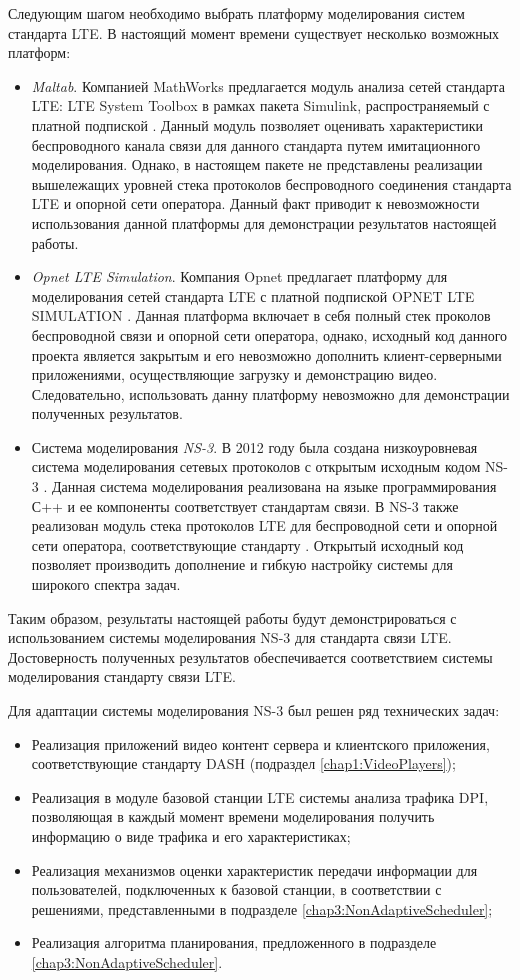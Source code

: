 Следующим шагом необходимо выбрать платформу моделирования систем стандарта LTE. В настоящий момент времени существует несколько возможных платформ:
\begin{itemize}
	\item \textit{Maltab}. Компанией MathWorks предлагается модуль анализа сетей стандарта LTE: LTE System Toolbox в рамках пакета Simulink, распространяемый с платной подпиской \cite{Matlab}. Данный модуль позволяет оценивать характеристики беспроводного канала связи для данного стандарта путем имитационного моделирования. Однако, в настоящем пакете не представлены реализации вышележащих уровней стека протоколов беспроводного соединения стандарта LTE и опорной сети оператора. Данный факт приводит к невозможности использования данной платформы для демонстрации результатов настоящей работы.
	\item \textit{Opnet LTE Simulation}. Компания Opnet предлагает платформу для моделирования сетей стандарта LTE с платной подпиской OPNET LTE SIMULATION \cite{Opnet}. Данная платформа включает в себя полный стек проколов беспроводной связи и опорной сети оператора, однако, исходный код данного проекта является закрытым и его невозможно дополнить клиент-серверными приложениями, осуществляющие загрузку и демонстрацию видео. Следовательно, использовать данну платформу невозможно для демонстрации полученных результатов.
	\item Система моделирования \textit{NS-3}. В 2012 году была создана низкоуровневая система моделирования сетевых протоколов с открытым исходным кодом NS-3 \cite{ns-3}. Данная система моделирования реализована на языке программирования С++ и ее компоненты соответствует стандартам связи. В NS-3 также реализован модуль стека протоколов LTE для беспроводной сети и опорной сети оператора, соответствующие стандарту \cite{lte_std}. Открытый исходный код позволяет производить дополнение и гибкую настройку системы для широкого спектра задач.
\end{itemize}

Таким образом, результаты настоящей работы будут демонстрироваться с использованием системы моделирования NS-3 для стандарта связи LTE. Достоверность полученных результатов обеспечивается соответствием системы моделирования стандарту связи LTE.

Для адаптации системы моделирования NS-3 был решен ряд технических задач:
\begin{itemize}
	\item Реализация приложений видео контент сервера и клиентского приложения, соответствующие стандарту DASH (подраздел \ref{chap1:VideoPlayers});
	\item Реализация в модуле базовой станции LTE системы анализа трафика DPI, позволяющая в каждый момент времени моделирования получить информацию о виде трафика и его характеристиках;
	\item Реализация механизмов оценки характеристик передачи информации для пользователей, подключенных к базовой станции, в соответствии с решениями, представленными в подразделе \ref{chap3:NonAdaptiveScheduler};
	\item Реализация алгоритма планирования, предложенного в подразделе \ref{chap3:NonAdaptiveScheduler}.
\end{itemize}

